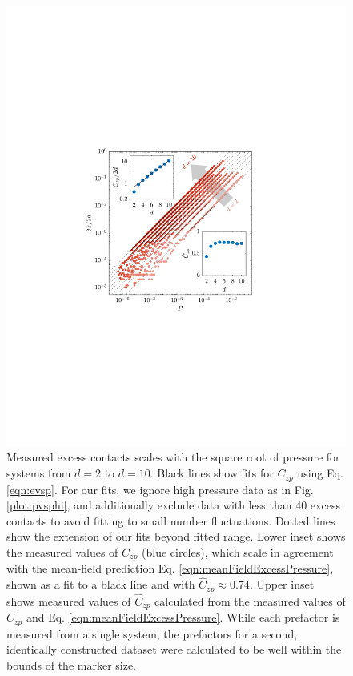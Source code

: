 %
%
\begin{figure}[t]
\includegraphics[width=\columnwidth, trim=143 244 169 255, clip]{excessContactsScaling/evspSub.pdf}
\caption{  Measured excess contacts scales with the square root of pressure for systems from $d=2$ to $d=10$. Black lines show fits for $C_{zp}$ using Eq. \ref{eqn:evsp}. For our fits, we ignore high pressure data as in Fig. \ref{plot:pvsphi}, and additionally exclude data with less than 40 excess contacts to avoid fitting to small number fluctuations. Dotted lines show the extension of our fits beyond fitted range. Lower inset shows the measured values of $C_{zp}$ (blue circles), which scale in agreement with the mean-field prediction Eq. \ref{eqn:meanFieldExcessPressure}, shown as a fit to a black line and with $\hat{C}_{zp} \approx 0.74$.  Upper inset shows measured values of $\hat{C}_{zp}$ calculated from the measured values of $C_{zp}$ and Eq. \ref{eqn:meanFieldExcessPressure}. While each prefactor is measured from a single system, the prefactors for a second, identically constructed dataset were calculated to be well within the bounds of the marker size.}
\label{plot:evsp}
\end{figure}
%
